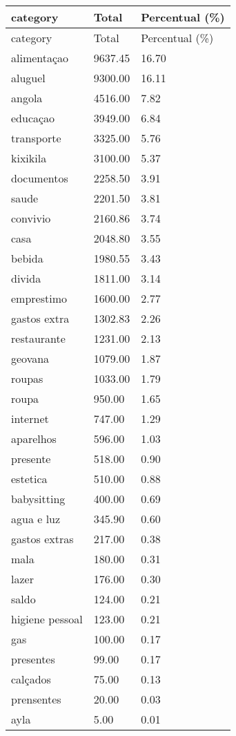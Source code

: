 \documentclass[
  8pt,
  a4paper,
  DIV=11,
  numbers=noendperiod]{scrartcl}
\begin{document}
\begin{figure}
\begin{minipage}{0.50\linewidth}
\begin{longtable}[]{@{}lll@{}}
\caption{}\label{T_bb052}\tabularnewline
\toprule\noalign{}
category & Total & Percentual (\%) \\
\midrule\noalign{}
\endfirsthead
\toprule\noalign{}
category & Total & Percentual (\%) \\
\midrule\noalign{}
\endhead
\bottomrule\noalign{}
\endlastfoot
alimentaçao & 9637.45 & 16.70 \\
aluguel & 9300.00 & 16.11 \\
angola & 4516.00 & 7.82 \\
educaçao & 3949.00 & 6.84 \\
transporte & 3325.00 & 5.76 \\
kixikila & 3100.00 & 5.37 \\
documentos & 2258.50 & 3.91 \\
saude & 2201.50 & 3.81 \\
convivio & 2160.86 & 3.74 \\
casa & 2048.80 & 3.55 \\
bebida & 1980.55 & 3.43 \\
divida & 1811.00 & 3.14 \\
emprestimo & 1600.00 & 2.77 \\
gastos extra & 1302.83 & 2.26 \\
restaurante & 1231.00 & 2.13 \\
geovana & 1079.00 & 1.87 \\
roupas & 1033.00 & 1.79 \\
roupa & 950.00 & 1.65 \\
internet & 747.00 & 1.29 \\
aparelhos & 596.00 & 1.03 \\
presente & 518.00 & 0.90 \\
estetica & 510.00 & 0.88 \\
babysitting & 400.00 & 0.69 \\
agua e luz & 345.90 & 0.60 \\
gastos extras & 217.00 & 0.38 \\
mala & 180.00 & 0.31 \\
lazer & 176.00 & 0.30 \\
saldo & 124.00 & 0.21 \\
higiene pessoal & 123.00 & 0.21 \\
gas & 100.00 & 0.17 \\
presentes & 99.00 & 0.17 \\
calçados & 75.00 & 0.13 \\
prensentes & 20.00 & 0.03 \\
ayla & 5.00 & 0.01 \\
\end{longtable}


\end{minipage}
\end{figure}
\end{document}
